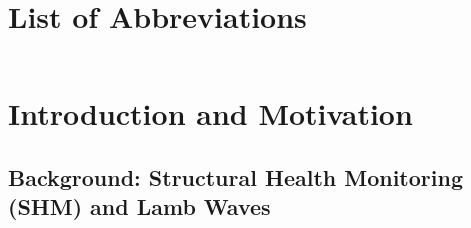 \documentclass[12pt,a4paper]{report}
\begin{document}
\listoffigures
\newpage

\listoftables
\newpage

\chapter*{List of Abbreviations}
\begin{tabular}{ll}

\end{tabular}
\newpage

\setcounter{page}{1}

\chapter{Introduction and Motivation}
\label{chap:introduction}

\section{Background: Structural Health Monitoring (SHM) and Lamb Waves}
\label{Background}
\end{document}
